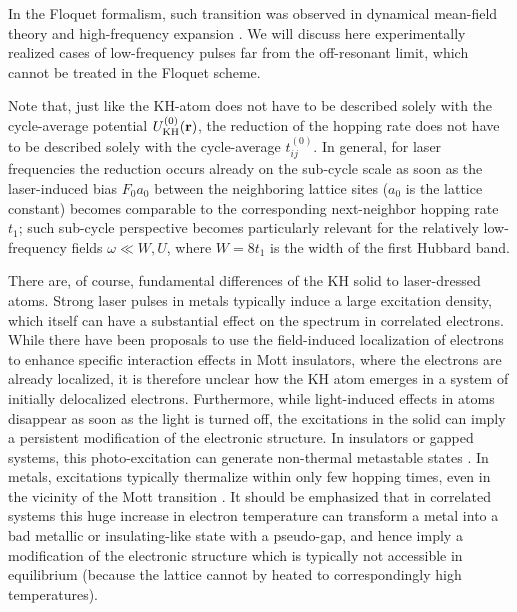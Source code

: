 In the Floquet formalism, such transition was observed in dynamical mean-field theory and high-frequency expansion \cite{PhysRevB.93.144307,PhysRevB.99.019902}. We will discuss here experimentally realized cases of low-frequency pulses 
far from the off-resonant limit, 
which cannot be treated in the Floquet scheme.


Note that, just like the 
KH-atom does not have to be described solely with 
the cycle-average potential $U^{(0)}_{\rm KH}({\bf r})$, 
the reduction of the hopping rate does not have to be
described solely with 
the cycle-average $t^{(0)}_{ij}$. In general, 
for 
laser frequencies the reduction 
occurs already on the sub-cycle scale\cite{PhysRevB.85.155124} as soon as the laser-induced bias $F_0a_0$ between the neighboring lattice sites ($a_0$ is the lattice constant) becomes comparable to the 
corresponding next-neighbor hopping rate $t_1$; such
sub-cycle perspective becomes particularly relevant 
for the relatively low-frequency fields 
$\omega \ll W, U$, where $W=8t_1$ is the width of the 
first Hubbard band. 

There are, of course, fundamental differences of the KH solid to laser-dressed atoms. Strong laser pulses in metals typically induce a large excitation density, which itself can have a substantial effect on the spectrum in correlated electrons. While there have been proposals to use the field-induced localization of electrons to enhance specific interaction effects in Mott insulators,\cite{dasari2019revealing,Werner_2015} where the electrons are already localized, it is therefore unclear how the KH atom emerges in a system of initially delocalized electrons. Furthermore, while light-induced effects in atoms disappear as soon as the light is turned off, the excitations in the solid can imply a persistent modification of the electronic structure. In insulators or gapped systems, this photo-excitation can generate non-thermal metastable states \cite {PhysRevLett.110.136404,PhysRevB.91.245153}. In metals, excitations typically thermalize within only few hopping times, even in the vicinity of the Mott transition \cite{PhysRevLett.120.166401, PhysRevLett.103.056403}. It should be emphasized that in correlated systems this huge increase in electron temperature can transform a metal into a bad metallic or insulating-like state with a pseudo-gap, and hence imply a modification of the electronic structure which is typically not accessible in equilibrium (because the lattice cannot by heated to correspondingly high temperatures).


